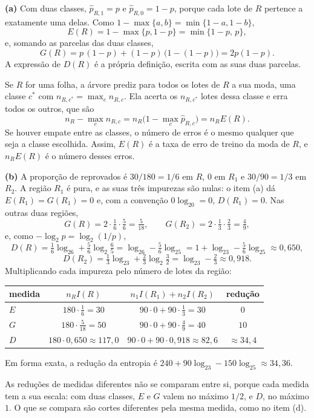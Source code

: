\documentclass[11pt,a4paper]{article}
\begin{document}
\begin{solucao}
\textbf{(a)} Com duas classes, $\widehat p_{R,1}=p$ e $\widehat p_{R,0}=1-p$, porque
cada lote de $R$ pertence a exatamente uma delas. Como $1-\max\{a,b\}=\min\{1-a,1-b\}$,
\[
  E(R)=1-\max\{p,1-p\}=\min\{1-p,\,p\},
\]
e, somando as parcelas das duas classes,
\[
  G(R)=p\,(1-p)+(1-p)\,\big(1-(1-p)\big)=2p(1-p).
\]
A expressão de $D(R)$ é a própria definição, escrita com as suas duas parcelas.

Se $R$ for uma folha, a árvore prediz para todos os lotes de $R$ a sua moda, uma classe
$c^*$ com $n_{R,c^*}=\max_cn_{R,c}$. Ela acerta os $n_{R,c^*}$ lotes dessa classe e erra
todos os outros, que são
\[
  n_R-\max_cn_{R,c}=n_R\Big(1-\max_c\widehat p_{R,c}\Big)=n_RE(R).
\]
Se houver empate entre as classes, o número de erros é o mesmo qualquer que seja a
classe escolhida. Assim, $E(R)$ é a taxa de erro de treino da moda de $R$, e $n_RE(R)$
é o número desses erros.

\smallskip
\textbf{(b)} A proporção de reprovados é $30/180=1/6$ em $R$, $0$ em $R_1$ e
$30/90=1/3$ em $R_2$. A região $R_1$ é pura, e as suas três impurezas são nulas: o
item (a) dá $E(R_1)=G(R_1)=0$ e, com a convenção $0\log_20=0$, $D(R_1)=0$. Nas outras
duas regiões,
\[
  G(R)=2\cdot\tfrac16\cdot\tfrac56=\tfrac5{18},
  \qquad
  G(R_2)=2\cdot\tfrac13\cdot\tfrac23=\tfrac49,
\]
e, como $-\log_2p=\log_2(1/p)$,
\[
  D(R)=\tfrac16\log_26+\tfrac56\log_2\tfrac65=\log_26-\tfrac56\log_25
       =1+\log_23-\tfrac56\log_25\approx0{,}650,
\]
\[
  D(R_2)=\tfrac13\log_23+\tfrac23\log_2\tfrac32=\log_23-\tfrac23\approx0{,}918 .
\]
Multiplicando cada impureza pelo número de lotes da região:
\begin{center}\small
\renewcommand{\arraystretch}{1.4}
\begin{tabular}{@{}lccc@{}}
\toprule
medida & $n_RI(R)$ & $n_1I(R_1)+n_2I(R_2)$ & redução \\
\midrule
$E$ & $180\cdot\frac16=30$ & $90\cdot0+90\cdot\frac13=30$ & $0$ \\
$G$ & $180\cdot\frac5{18}=50$ & $90\cdot0+90\cdot\frac49=40$ & $10$ \\
$D$ & $180\cdot0{,}650\approx117{,}0$ & $90\cdot0+90\cdot0{,}918\approx82{,}6$ & $\approx34{,}4$ \\
\bottomrule
\end{tabular}
\end{center}
Em forma exata, a redução da entropia é $240+90\log_23-150\log_25\approx34{,}36$.

As reduções de medidas diferentes não se comparam entre si, porque cada medida tem a
sua escala: com duas classes, $E$ e $G$ valem no máximo $1/2$, e $D$, no máximo $1$.
O que se compara são cortes diferentes pela mesma medida, como no item (d).


\end{solucao}
\end{document}
